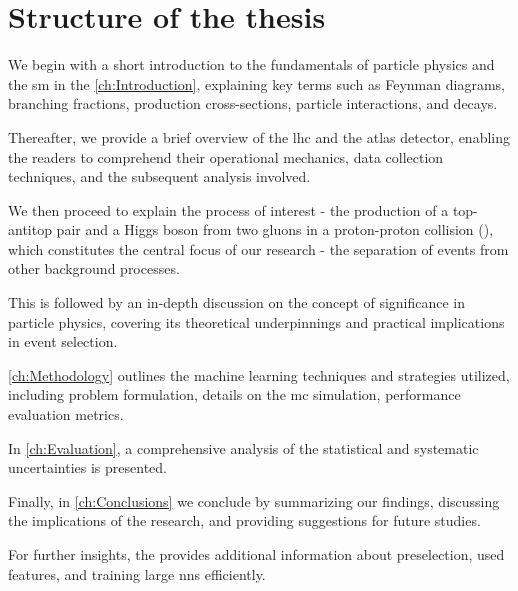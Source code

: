 \chapter*{Structure of the thesis}

We begin with a short introduction to the fundamentals of particle physics and the \gls{sm} in the
\autoref{ch:Introduction}, explaining key terms such as Feynman diagrams, branching fractions, production
cross-sections, particle interactions, and decays.

Thereafter, we provide a brief overview of the \gls{lhc} and the \gls{atlas} detector, enabling the readers to
comprehend their operational mechanics, data collection techniques, and the subsequent analysis involved.

We then proceed to explain the process of interest - the production of a top-antitop pair and a Higgs boson from two
gluons in a proton-proton collision (\tth), which constitutes the central focus of our research - the separation of \tth
events from other background processes.

This is followed by an in-depth discussion on the concept of significance in particle physics, covering its theoretical
underpinnings and practical implications in event selection.

\autoref{ch:Methodology} outlines the machine learning techniques and strategies utilized, including
problem formulation, details on the \gls{mc} simulation, performance evaluation metrics.

In \autoref{ch:Evaluation}, a comprehensive analysis of the statistical and systematic uncertainties is
presented.

Finally, in \autoref{ch:Conclusions} we conclude by summarizing our findings, discussing the implications
of the research, and providing suggestions for future studies.

For further insights, the \textbf{} provides additional information about preselection, used features,
and training large \glspl{nn} efficiently.